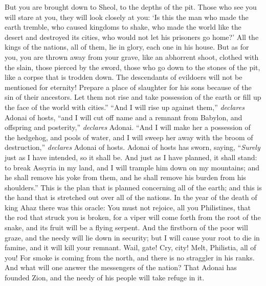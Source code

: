 \begin{biblechapter}
\verse But you are brought down to Sheol, 
to the depths of the pit.
\verse Those who see you will stare at you, 
they will look closely at you: 
‘Is this the man who made the earth tremble, 
who caused kingdoms to shake,
\verse who made the world like the desert 
and destroyed its cities, 
who would not let his prisoners go home?’
\verse All the kings of the nations, all of them, lie in glory, 
each one in his house.
\verse But as for you, you are thrown away from your grave, 
like an abhorrent shoot, 
clothed with the slain, 
those pierced by the sword, 
those who go down to the stones of the pit, 
like a corpse that is trodden down. The descendants of evildoers will not be mentioned for eternity!
\verse Prepare a place of slaughter for his sons 
because of the sin of their ancestors. 
Let them not rise and take possession of the earth 
or fill up the face of the world with cities.”
\verse “And I will rise up against them,” \textit{declares} Adonai of hosts, “and I will cut off name and a remnant from Babylon, 
and offspring and posterity,” \textit{declares} Adonai.
\verse “And I will make her a possession of the hedgehog, 
and pools of water, 
and I will sweep her away with the broom of destruction,” \textit{declares} Adonai of hosts.
 Adonai of hosts has sworn, saying,
\verse “\textit{Surely} just as I have intended, so it shall be. 
And just as I have planned, it shall stand:
\verse to break Assyria in my land, 
and I will trample him down on my mountains; 
and he shall remove his yoke from them, 
and he shall remove his burden from his shoulders.”
\verse This is the plan that is planned concerning all of the earth; 
and this is the hand that is stretched out over all of the nations.
 In the year of the death of king Ahaz there was this oracle:
\verse You must not rejoice, all you Philistines, 
that the rod that struck you is broken, 
for a viper will come forth from the root of the snake, 
and its fruit will be a flying serpent.
\verse And the firstborn of the poor will graze, 
and the needy will lie down in security; 
but I will cause your root to die in famine, 
and it will kill your remnant.
\verse Wail, gate! Cry, city! 
Melt, Philistia, all of you! 
For smoke is coming from the north, 
and there is no straggler in his ranks.
\verse And what will one answer the messengers of the nation? That Adonai has founded Zion, 
and the needy of his people will take refuge in it.
\end{biblechapter}

